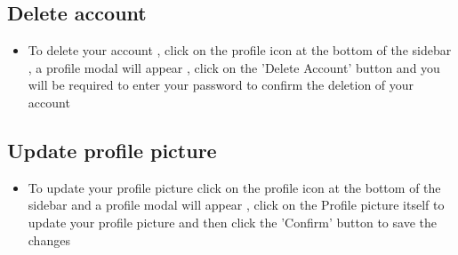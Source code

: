 \documentclass[12pt]{article}
\begin{document}
\subsection{Delete account}
\begin{itemize}
    \item To delete your account , click on the profile icon at the bottom of the sidebar , a profile modal will appear , click on the 'Delete Account' button and you will be required to enter your password to confirm the deletion of your account
\end{itemize}
\subsection{Update profile picture}
\begin{itemize}
    \item To update your profile picture click on the profile icon at the bottom of the sidebar and a profile modal will appear , click on the Profile picture itself to update your profile picture and then click the 'Confirm' button to save the changes
\end{itemize}

\newpage
\end{document}
